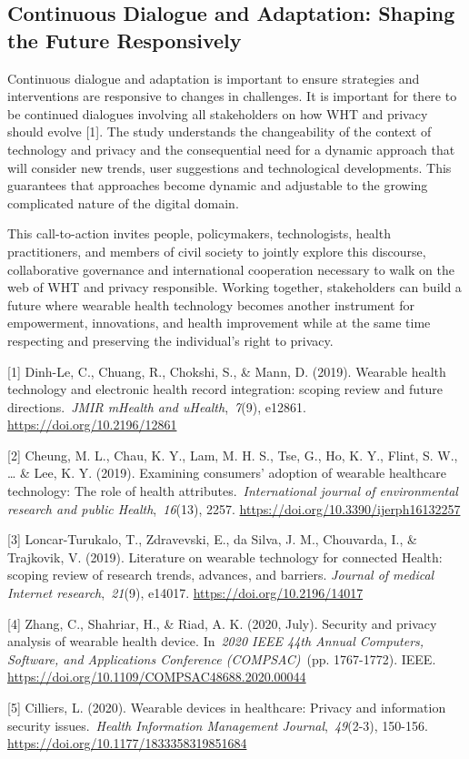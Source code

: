\documentclass[11pt]{article}
\begin{document}
\subsection{Continuous Dialogue and Adaptation: Shaping the Future Responsively}

Continuous dialogue and adaptation is important to ensure strategies and interventions are responsive to changes in challenges. It is important for there to be continued dialogues involving all stakeholders on how WHT and privacy should evolve [1]. The study understands the changeability of the context of technology and privacy and the consequential need for a dynamic approach that will consider new trends, user suggestions and technological developments. This guarantees that approaches become dynamic and adjustable to the growing complicated nature of the digital domain.

This call-to-action invites people, policymakers, technologists, health practitioners, and members of civil society to jointly explore this discourse, collaborative governance and international cooperation necessary to walk on the web of WHT and privacy responsible. Working together, stakeholders can build a future where wearable health technology becomes another instrument for empowerment, innovations, and health improvement while at the same time respecting and preserving the individual’s right to privacy.

\begin{references}
\item {}[1] Dinh-Le, C., Chuang, R., Chokshi, S., \& Mann, D. (2019). Wearable health technology and electronic health record integration: scoping review and future directions. \textit{JMIR mHealth and uHealth}, \textit{7}(9), e12861. \url{https://doi.org/10.2196/12861}
\item {}[2] Cheung, M. L., Chau, K. Y., Lam, M. H. S., Tse, G., Ho, K. Y., Flint, S. W., \ldots{} \& Lee, K. Y. (2019). Examining consumers’ adoption of wearable healthcare technology: The role of health attributes. \textit{International journal of environmental research and public Health}, \textit{16}(13), 2257. \url{https://doi.org/10.3390/ijerph16132257}
\item {}[3] Loncar-Turukalo, T., Zdravevski, E., da Silva, J. M., Chouvarda, I., \& Trajkovik, V. (2019). Literature on wearable technology for connected Health: scoping review of research trends, advances, and barriers. \textit{Journal of medical Internet research}, \textit{21}(9), e14017. \url{https://doi.org/10.2196/14017}
\item {}[4] Zhang, C., Shahriar, H., \& Riad, A. K. (2020, July). Security and privacy analysis of wearable health device. In \textit{2020 IEEE 44th Annual Computers, Software, and Applications Conference (COMPSAC)} (pp. 1767-1772). IEEE. \url{https://doi.org/10.1109/COMPSAC48688.2020.00044}
\item {}[5] Cilliers, L. (2020). Wearable devices in healthcare: Privacy and information security issues. \textit{Health Information Management Journal}, \textit{49}(2-3), 150-156. \url{https://doi.org/10.1177/1833358319851684}
\end{references}
\end{document}
